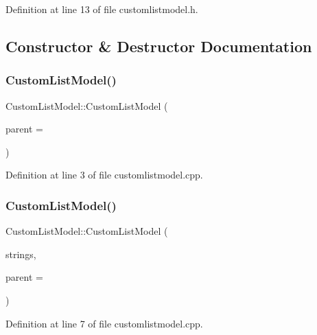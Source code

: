 Definition at line 13 of file customlistmodel.\+h.



\subsection{Constructor \& Destructor Documentation}
\mbox{\label{classCustomListModel_a6a9dfff471a701c3f34f005019f345f3}} 
\subsubsection{\texorpdfstring{Custom\+List\+Model()}{CustomListModel()}\hspace{0.1cm}{\footnotesize\ttfamily [1/2]}}
{\footnotesize\ttfamily Custom\+List\+Model\+::\+Custom\+List\+Model (\begin{DoxyParamCaption}\item[{Q\+Object $\ast$}]{parent = {} }\end{DoxyParamCaption})}



Definition at line 3 of file customlistmodel.\+cpp.

\mbox{\label{classCustomListModel_aad529c6a4d9cac4a48b46c92b26930eb}} 
\subsubsection{\texorpdfstring{Custom\+List\+Model()}{CustomListModel()}\hspace{0.1cm}{\footnotesize\ttfamily [2/2]}}
{\footnotesize\ttfamily Custom\+List\+Model\+::\+Custom\+List\+Model (\begin{DoxyParamCaption}\item[{const Q\+String\+List \&}]{strings,  }\item[{Q\+Object $\ast$}]{parent = {} }\end{DoxyParamCaption})}



Definition at line 7 of file customlistmodel.\+cpp.



